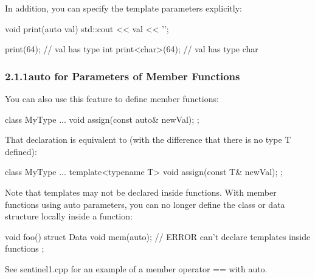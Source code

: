 In addition, you can specify the template parameters explicitly:

\begin{cpp}
void print(auto val)
{
	std::cout << val << '\n';
}

print(64); // val has type int
print<char>(64); // val has type char
\end{cpp}


\subsubsection*{ 2.1.1\hspace{0.2cm}auto for Parameters of Member Functions}

You can also use this feature to define member functions:

\begin{cpp}
class MyType {
	...
	void assign(const auto& newVal);
};
\end{cpp}

That declaration is equivalent to (with the difference that there is no type T defined):

\begin{cpp}
class MyType {
	...
	template<typename T>
	void assign(const T& newVal);
};
\end{cpp}

Note that templates may not be declared inside functions. With member functions using auto parameters, you can no longer define the class or data structure locally inside a function:

\begin{cpp}
void foo()
{
	struct Data {
		void mem(auto); // ERROR can’t declare templates inside functions
	};
}
\end{cpp}

See sentinel1.cpp for an example of a member operator == with auto.
